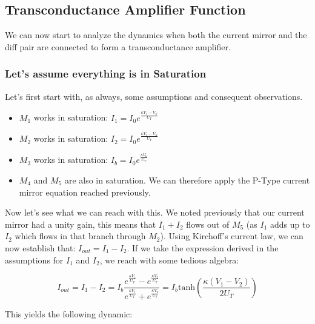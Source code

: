 \subsection{Transconductance Amplifier Function}

We can now start to analyze the dynamics when both the current mirror and the diff pair are connected to form a transconductance amplifier.

\subsubsection{Let's assume everything is in Saturation}

Let's first start with, as always, some assumptions and consequent observations. 
\begin{itemize}
    \item $M_1$ works in saturation: $I_1 = I_0 e^{\frac{\kappa V_1 - V_S}{U_T}}$
    \item $M_2$ works in saturation: $I_2 = I_0 e^{\frac{\kappa V_2 - V_S}{U_T}}$
    \item $M_3$ works in saturation: $I_b = I_0 e^{\frac{\kappa V_b}{U_T}}$
    \item $M_4$ and $M_5$ are also in saturation. We can therefore apply the P-Type current mirror equation reached previously. 
\end{itemize}

Now let's see what we can reach with this. We noted previously that our current mirror had a unity gain, this means that $I_1 + I_2$ flows out of $M_5$ (as $I_1$ adds up to $I_2$ which flows in that branch through $M_2$). Using Kirchoff's current law, we can now establish that: $I_{out} = I_1 - I_2$. If we take the expression derived in the assumptions for $I_1$ and $I_2$, we reach with some tedious algebra: 

\begin{equation}
    I_{out} = I_1 - I_2 = I_b\frac{e^{\frac{\kappa V_1}{U_T}} - e^{\frac{\kappa V_2}{U_T}}}{e^{\frac{\kappa V_1}{U_T}} + e^{\frac{\kappa V_2}{U_T}}} = I_b \mathrm{tanh}(\frac{\kappa (V_1 - V_2)}{2U_T}) 
\end{equation}

This yields the following dynamic: 

